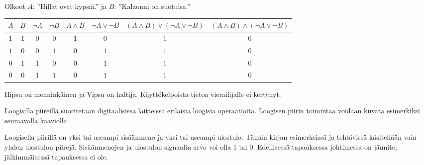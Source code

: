 \begin{tehtavasivu}
\begin{tehtava}
    \begin{vastaus}
    Olkoot $A$: ''Hillat ovat kypsiä.'' ja $B$: ''Kalaonni on suotuisa.''
    \begin{center}
		    \begin{tabular}{|c|c|c|c|c|c|c|c|}\hline
		    $A$ & $B$ & $\lnot A$ & $\lnot B$ & $A\land B$ & 
		         $\lnot A\lor \lnot B$ & $(A \land B)\lor(\lnot A\lor \lnot B)$ & $(A\land B)\land(\lnot A\lor \lnot B)$ \\ \hline
		    $1$ & $1$ & $0$ & $0$ & $1$ & $0$ & $1$ & $0$  \\ %
		    $1$ & $0$ & $0$ & $1$ & $0$ & $1$ & $1$ & $0$  \\
		    $0$ & $1$ & $1$ & $0$ & $0$ & $1$ & $1$ & $0$  \\
		    $0$ & $0$ & $1$ & $1$ & $0$ & $1$ & $1$ & $0$  \\ \hline
\end{tabular}
\end{center}
	Hipsu on menninkäinen ja Vipsu on haltija. Käyttökelpoista tietoa vierailijalle ei kertynyt. %
    \end{vastaus}
    
\end{tehtava}

\begin{tehtava}
        Loogisilla piireillä suoritetaan digitaalisissa laitteissa erilaisia loogisia operaatioita. Loogisen piirin toimintaa voidaan kuvata esimerkiksi seuraavalla kaaviolla.

        \medskip

        \begin{center}
        \end{center}

        \medskip

        Loogisella piirillä on yksi tai useampi sisäänmeno ja
        yksi tai useampi ulostulo. Tämän kirjan esimerkeissä ja
        tehtävissä käsitellään vain yhden ulostulon piirejä.
        Sisäänmenojen ja ulostulon signaalin arvo
        voi olla 1 tai 0. Edellisessä tapauksessa johtimessa on
        jännite, jälkimmäisessä tapauksessa ei ole.


\end{tehtava}
\end{tehtavasivu}
